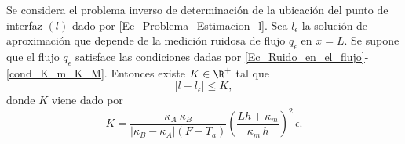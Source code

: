 \begin{theorem} \label{teorema_Error_Aprox_l}

Se considera el problema inverso de determinaci\'on de la ubicaci\'on del punto de interfaz $(l)$ dado por \eqref{Ec_Problema_Estimacion_l}.
Sea $l_\epsilon$ la soluci\'on de aproximaci\'on que depende de la medici\'on ruidosa de flujo $q_\epsilon$ en $x=L$. Se supone que el flujo
$q_\epsilon$ satisface las condiciones dadas por \eqref{Ec_Ruido_en_el_flujo}-\eqref{cond_K_m_K_M}. Entonces existe $K \in \R^+ $  tal que 
%
\begin{equation*}
\label{cota_l}
\left|l-l_\epsilon\right|\leq K,
\end{equation*}
%
donde $K$ viene dado por
%
\begin{equation*}
\label{cota_K}
K= \dfrac{\kappa_A \ \kappa_B }{\left|\kappa_B - \kappa_A\right| (F-T_a)} \left(\dfrac{Lh+\kappa_m}{\kappa_m \, h}\right)^2 \, \epsilon.
\end{equation*}
%
\end{theorem}
%
